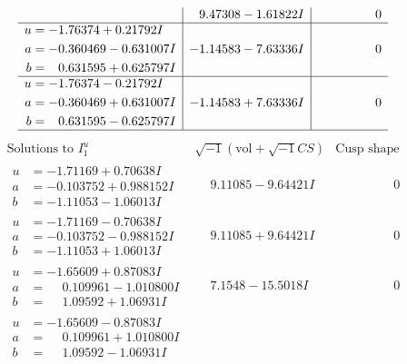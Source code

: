 \documentclass[1p]{elsarticle_modified}
\theoremstyle{definition}
\newcommand{\I}{\sqrt{-1}}
\begin{document}
$$\begin{array}{c|c|c}
 & \phantom{-}9.47308 - 1.61822 I & \phantom{-0.000000 } 0 \\ \hline\begin{aligned}
u &= -1.76374 + 0.21792 I \\
a &= -0.360469 - 0.631007 I \\
b &= \phantom{-}0.631595 + 0.625797 I\end{aligned}
 & -1.14583 - 7.63336 I & \phantom{-0.000000 } 0 \\ \hline\begin{aligned}
u &= -1.76374 - 0.21792 I \\
a &= -0.360469 + 0.631007 I \\
b &= \phantom{-}0.631595 - 0.625797 I\end{aligned}
 & -1.14583 + 7.63336 I & \phantom{-0.000000 } 0\\
 \hline 
 \end{array}$$\newpage$$\begin{array}{c|c|c}  
\text{Solutions to }I^u_{1}& \I (\text{vol} + \sqrt{-1}CS) & \text{Cusp shape}\\
 \hline 
\begin{aligned}
u &= -1.71169 + 0.70638 I \\
a &= -0.103752 + 0.988152 I \\
b &= -1.11053 - 1.06013 I\end{aligned}
 & \phantom{-}9.11085 - 9.64421 I & \phantom{-0.000000 } 0 \\ \hline\begin{aligned}
u &= -1.71169 - 0.70638 I \\
a &= -0.103752 - 0.988152 I \\
b &= -1.11053 + 1.06013 I\end{aligned}
 & \phantom{-}9.11085 + 9.64421 I & \phantom{-0.000000 } 0 \\ \hline\begin{aligned}
u &= -1.65609 + 0.87083 I \\
a &= \phantom{-}0.109961 - 1.010800 I \\
b &= \phantom{-}1.09592 + 1.06931 I\end{aligned}
 & \phantom{-}7.1548 - 15.5018 I & \phantom{-0.000000 } 0 \\ \hline\begin{aligned}
u &= -1.65609 - 0.87083 I \\
a &= \phantom{-}0.109961 + 1.010800 I \\
b &= \phantom{-}1.09592 - 1.06931 I\end{aligned}

\end{array}$$
\end{document}
